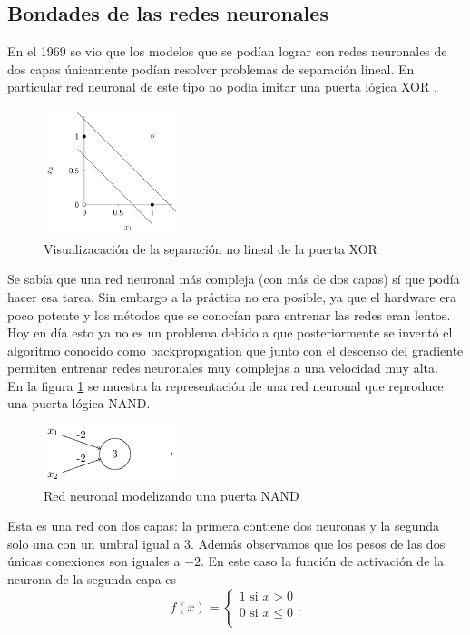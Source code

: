 \documentclass{article}
\begin{document}
\subsection{Bondades de las redes neuronales}
En el 1969 se vio que los modelos que se podían lograr con redes neuronales de dos capas únicamente podían resolver problemas de separación lineal. En particular red neuronal de este tipo no podía imitar una puerta lógica XOR \cite{HistoryofthefirstAIWinterTowardsDataScience-2020-06-19}.\\

\begin{figure}[htbp]
\centering
\includegraphics[width=4cm]{XOR.png}
\caption{Visualizacación de la separación no lineal de la puerta XOR}
\end{figure}
Se sabía que una red neuronal más compleja (con más de dos capas) sí que podía hacer esa tarea. Sin embargo a la práctica no era posible, ya que el hardware era poco potente y los métodos que se conocían para entrenar las redes eran lentos.\\
Hoy en día esto ya no es un problema debido a que posteriormente se inventó el algoritmo conocido como backpropagation que junto con el descenso del gradiente permiten entrenar redes neuronales muy complejas a una velocidad muy alta.\\

En la figura \ref{fig:red_nand} se muestra la representación de una red neuronal que reproduce una puerta lógica NAND.
\begin{figure}[htbp]
\centering
\includegraphics[width=4cm]{NAND.png}
\caption{Red neuronal modelizando una puerta NAND}
\label{fig:red_nand}
\end{figure}
Esta es una red con dos capas: la primera contiene dos neuronas y la segunda solo una con un umbral igual a $3$. Además observamos que los pesos de las dos únicas conexiones son iguales a $-2$. En este caso la función de activación de la neurona de la segunda capa es 
$$f(x)=\begin{cases}
1 \text{ si } x>0\\
0 \text{ si } x\leq 0\\
\end{cases}.$$
\end{document}
